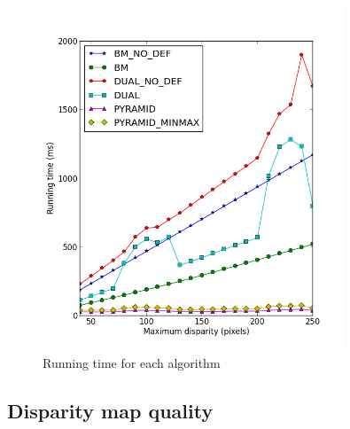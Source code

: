 \begin{figure}
  \centering
  \includegraphics[width=0.8\textwidth]{images/runtime_9.png}
  \caption{Running time for each algorithm}
  \label{runtime-9}
\end{figure}


\subsection{Disparity map quality}

